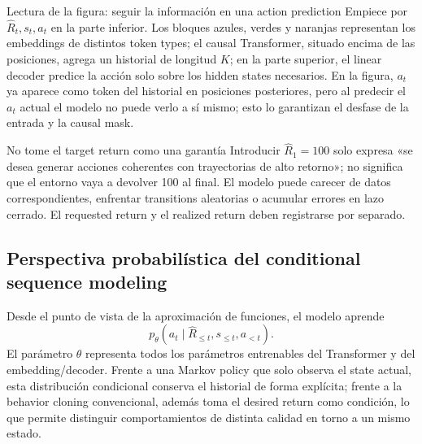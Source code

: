 
\begin{knowledgebox}{Lectura de la figura: seguir la información en una action prediction}
Empiece por $\widehat{R}_t,s_t,a_t$ en la parte inferior. Los bloques azules, verdes y naranjas representan los embeddings de distintos token types; el causal Transformer, situado encima de las posiciones, agrega un historial de longitud $K$; en la parte superior, el linear decoder predice la acción solo sobre los hidden states necesarios. En la figura, $a_t$ ya aparece como token del historial en posiciones posteriores, pero al predecir el $a_t$ actual el modelo no puede verlo a sí mismo; esto lo garantizan el desfase de la entrada y la causal mask.
\end{knowledgebox}

\begin{warningbox}{No tome el target return como una garantía}
Introducir $\widehat{R}_1=100$ solo expresa «se desea generar acciones coherentes con trayectorias de alto retorno»; no significa que el entorno vaya a devolver 100 al final. El modelo puede carecer de datos correspondientes, enfrentar transitions aleatorias o acumular errores en lazo cerrado. El requested return y el realized return deben registrarse por separado.
\end{warningbox}

\subsection{Perspectiva probabilística del conditional sequence modeling}

Desde el punto de vista de la aproximación de funciones, el modelo aprende
\[
p_{\theta}(a_t\mid \widehat{R}_{\le t},s_{\le t},a_{<t}).
\]
El parámetro $\theta$ representa todos los parámetros entrenables del Transformer y del embedding/decoder. Frente a una Markov policy que solo observa el state actual, esta distribución condicional conserva el historial de forma explícita; frente a la behavior cloning convencional, además toma el desired return como condición, lo que permite distinguir comportamientos de distinta calidad en torno a un mismo estado.

